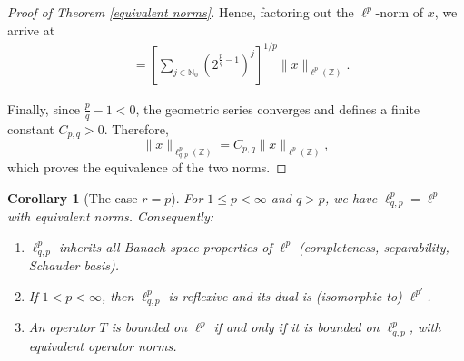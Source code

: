 \documentclass[preprint,12pt]{elsarticle}
\newtheorem{corollary}{Corollary}[theorem]
\begin{document}
\begin{proof}[Proof of Theorem \ref{equivalent norms}]
Hence, factoring out the $\ell^{p}$-norm of $x$, we arrive at
\begin{equation*}
     \begin{split}
&=\left[\sum\limits_{j\in\mathbb{N}_{0}}
\left(2 ^{\frac{p}{q}-1}\right)^{j}\right]  ^{1/p}\|x\|_{\ell^{p}(\mathbb{Z})}.
     \end{split}
\end{equation*}

Finally, since $\tfrac{p}{q}-1<0$, the geometric series converges and defines a finite constant $C_{p,q}>0$. Therefore,
\begin{equation}\label{multconstnorm}
\|x\| _{\ell_{q,p}^{p}(\mathbb{Z})}=C_{p,q}\|x\|_{\ell^{p}(\mathbb{Z})},
\end{equation}
which proves the equivalence of the two norms.
\end{proof}

\begin{corollary}[The case $r=p$]\label{rmk:case_q_infty}
For $1\le p<\infty$ and $q>p$, we have $\ell^p_{q,p} = \ell^p$ with equivalent norms. Consequently:
\begin{enumerate}
\item $\ell^p_{q,p}$ inherits all Banach space properties of $\ell^p$ (completeness, separability, Schauder basis).
\item If $1<p<\infty$, then $\ell^p_{q,p}$ is reflexive and its dual is (isomorphic to) $\ell^{p'}$.
\item An operator $T$ is bounded on $\ell^p$ if and only if it is bounded on $\ell^p_{q,p}$, with equivalent operator norms.
\end{enumerate}
\end{corollary}
\end{document}
